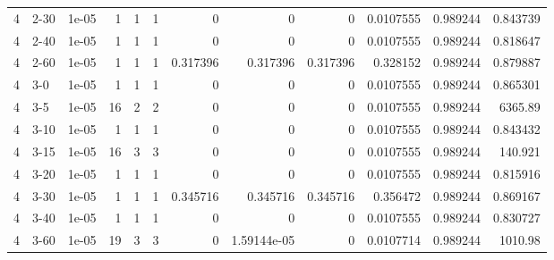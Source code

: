 \begin{tabular}{rlrrrrrrrrrr}
     4 & 2-30   &      1e-05 &           1 &                 1 &                 1 &     0           &     0           &      0           &        0.0107555 &               0.989244 &           0.843739 \\
     4 & 2-40   &      1e-05 &           1 &                 1 &                 1 &     0           &     0           &      0           &        0.0107555 &               0.989244 &           0.818647 \\
     4 & 2-60   &      1e-05 &           1 &                 1 &                 1 &     0.317396    &     0.317396    &      0.317396    &        0.328152  &               0.989244 &           0.879887 \\
     4 & 3-0    &      1e-05 &           1 &                 1 &                 1 &     0           &     0           &      0           &        0.0107555 &               0.989244 &           0.865301 \\
     4 & 3-5    &      1e-05 &          16 &                 2 &                 2 &     0           &     0           &      0           &        0.0107555 &               0.989244 &        6365.89     \\
     4 & 3-10   &      1e-05 &           1 &                 1 &                 1 &     0           &     0           &      0           &        0.0107555 &               0.989244 &           0.843432 \\
     4 & 3-15   &      1e-05 &          16 &                 3 &                 3 &     0           &     0           &      0           &        0.0107555 &               0.989244 &         140.921    \\
     4 & 3-20   &      1e-05 &           1 &                 1 &                 1 &     0           &     0           &      0           &        0.0107555 &               0.989244 &           0.815916 \\
     4 & 3-30   &      1e-05 &           1 &                 1 &                 1 &     0.345716    &     0.345716    &      0.345716    &        0.356472  &               0.989244 &           0.869167 \\
     4 & 3-40   &      1e-05 &           1 &                 1 &                 1 &     0           &     0           &      0           &        0.0107555 &               0.989244 &           0.830727 \\
     4 & 3-60   &      1e-05 &          19 &                 3 &                 3 &     0           &     1.59144e-05 &      0           &        0.0107714 &               0.989244 &        1010.98     \\

\end{tabular}
